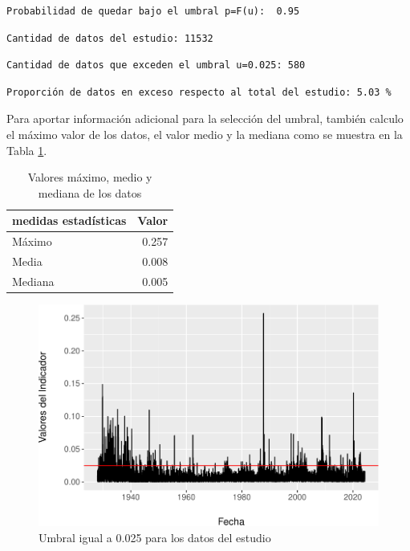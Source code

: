 \documentclass[
  12pt]{article}
\begin{document}
\begin{verbatim}
Probabilidad de quedar bajo el umbral p=F(u):  0.95
\end{verbatim}

\begin{verbatim}
Cantidad de datos del estudio: 11532 
\end{verbatim}

\begin{verbatim}
Cantidad de datos que exceden el umbral u=0.025: 580 
\end{verbatim}

\begin{verbatim}
Proporción de datos en exceso respecto al total del estudio: 5.03 %
\end{verbatim}

Para aportar información adicional para la selección del umbral, también
calculo el máximo valor de los datos, el valor medio y la mediana como
se muestra en la Tabla \ref{tabla_1}.

\vspace{1cm}

\begin{table}[ht]
\centering
\begin{tabular}{lr}
  \hline
medidas estadísticas & Valor \\ 
  \hline
Máximo & 0.257 \\ 
  Media & 0.008 \\ 
  Mediana & 0.005 \\ 
   \hline
\end{tabular}
\caption{Valores máximo, medio y mediana de los datos} 
\label{tabla_1}
\end{table}

\begin{figure}
\centering
\includegraphics{Entrega_files/figure-latex/fig3-1.pdf}
\caption{Umbral igual a 0.025 para los datos del estudio}
\end{figure}
\end{document}
